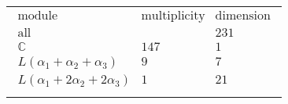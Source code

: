 \documentclass[crop,border=2mm]{standalone}
\begin{document}
\begin{tabular}{l}
$\displaystyle
\begin{array}{rll}
	\text{module}&\text{multiplicity}&\text{dimension} \\ \hline \text{all}&&231 \\
	\mathbb{C}&147&1\\
	L\left(\alpha_{1}+\alpha_{2}+\alpha_{3}\right)&9&7\\
	L\left(\alpha_{1}+ 2\alpha_{2}+ 2\alpha_{3}\right)&1&21
\end{array}
$ \\ \\

\end{tabular}
\end{document}
